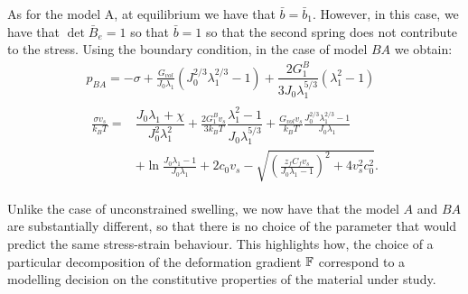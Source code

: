 As for the model A, at equilibrium we have that $\bar{b}=\bar{b}_1$. However, in this case, we have that $\det \bar{B}_e=1$ so that $\bar{b}=1$ so that the second spring does not contribute to the stress. Using the boundary condition, in the case of model $BA$ we obtain:
\begin{gather}
\displaystyle 
p_{BA} = -\sigma + \frac{G_{vol}}{J_0\lambda_1}(J_0^{2/3}\lambda_1^{2/3}-1)+\dfrac{2G^B_1}{3J_0\lambda_1^{5/3}} (\lambda_1^2-1) \\
\begin{aligned}
\frac{\sigma v_s}{k_B T}=&\dfrac{J_0\lambda_1+\chi}{J_0^2\lambda^2_1}+\frac{2G_1^Bv_s}{3k_BT} \dfrac{\lambda^2_1-1}{J_0 \lambda_1^{5/3}}+\frac{G_{vol}v_s}{k_BT}\frac{J_0^{2/3}\lambda_1^{2/3}-1}{J_0\lambda_1}\\[1.5mm]
& +\ln \frac{J_0\lambda_1-1}{J_0\lambda_1}+2c_0v_s-\sqrt{\left(\frac{z_fC_fv_s}{J_0\lambda_1-1}\right)^2+4v_s^2c^2_0}.\label{compAB}
\end{aligned}
\end{gather}

Unlike the case of unconstrained swelling, we now have that the model $A$ and $BA$ are substantially different, so that there is no choice of the parameter that would predict the same stress-strain behaviour. This highlights how, the choice of a particular decomposition of the deformation gradient $\mathbb{F}$ correspond to a modelling decision on the constitutive properties of the material under study.  

